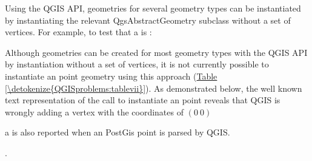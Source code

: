\documentclass[a4paper,11pt,english]{sphinxmanual}
\begin{document}
Using the QGIS API,  geometries for several geometry types can be instantiated by instantiating the relevant QgsAbstractGeometry subclass without a set of vertices.  For example, to test that a  is :

\begin{sphinxVerbatim}[commandchars=\\\{\}]
   
\end{sphinxVerbatim}

Although  geometries can be created for most geometry types with the QGIS API by instantiation without a set of vertices, it is not currently possible to instantiate an  point geometry using this approach (\hyperref[\detokenize{QGISproblems:tablevii}]{Table \ref{\detokenize{QGISproblems:tablevii}}}). As demonstrated below, the well known text representation of the call to instantiate an  point reveals that QGIS is wrongly adding a vertex with the coordinates of \((0\ 0)\)  %
\begin{footnote}[10]\sphinxAtStartFootnote
a  is also reported when an  PostGis point is parsed by QGIS.
%
\end{footnote}.

\begin{sphinxVerbatim}[commandchars=\\\{\}]
   
\end{sphinxVerbatim}
\end{document}
